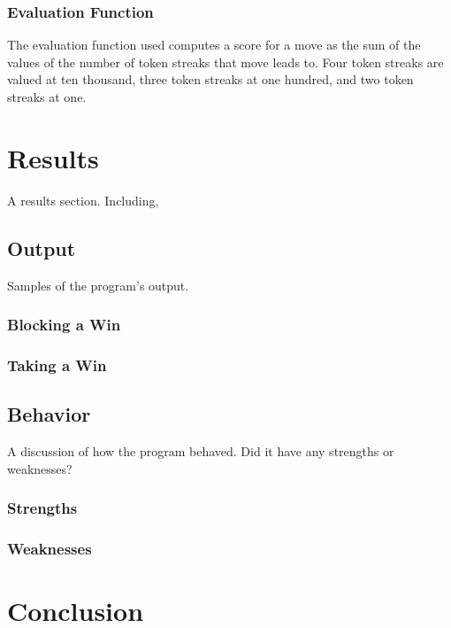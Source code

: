 \documentclass[12pt, article]{scrartcl}
\begin{document}
\subsubsection{Evaluation Function}
The evaluation function used computes a score for a move as the sum of the values of the number of token streaks that move leads to. Four token streaks are valued at ten thousand, three token streaks at one hundred, and two token streaks at one.

\section{Results}
A results section. Including,
\subsection{Output}
Samples of the program's output. 
\subsubsection{Blocking a Win}
\subsubsection{Taking a Win}
\subsection{Behavior}
A discussion of how the program behaved. Did it have any strengths or weaknesses?
\subsubsection{Strengths}
\subsubsection{Weaknesses}
\section{Conclusion}
\end{document}
